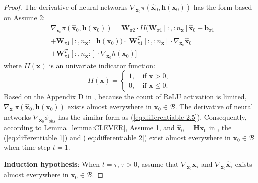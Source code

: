 \documentclass[conference]{IEEEtran}
\newtheorem{proof}{\bf Proof}
\newcommand{\myvec}[1]{\boldsymbol{#1}}
\newcommand{\mymatrix}[1]{\boldsymbol{#1}}
\newcommand{\relu}{ReLU\xspace}
\newcommand{\calB}{\mathcal{B}}
\begin{document}
\begin{proof}
    The derivative of neural networks $\nabla_{\myvec{x}_{0}}\pi(\hat{\myvec{x}}_{0}, 
    \myvec{h}(\myvec{x}_{0}))$ has the form based on Assume 2: 
    \begin{equation}\label{eq:differentiable 2.5}
      \begin{aligned}
      &\nabla_{\myvec{x}_{0}}\pi(\hat{\myvec{x}}_{0},\myvec{h}(\myvec{x}_{0})) = 
      \mymatrix{W}_{\pi 2} \cdot II( \mymatrix{W}_{\pi 1}[:,:n_{\myvec{x}}]\hat{\myvec{x}}_{0} + \myvec{b}_{\pi 1} \\
      & + \mymatrix{W}_{\pi 1}[:,n_{\myvec{x}}:]\myvec{h}(\myvec{x}_{0}) )
      \cdot [ \mymatrix{W}^{T}_{\pi 1}[:,:n_{\myvec{x}}] \cdot \nabla_{\myvec{x}_{0}}\hat{\myvec{x}}_{0} \\
      &+ \mymatrix{W}^{T}_{\pi 1}[:,n_{\myvec{x}}:] \cdot \nabla_{\myvec{x}_{0}}h(\myvec{x}_{0}) ]
    \end{aligned}
    \end{equation}
    where $II(\myvec{x})$ is an univariate indicator function: 
    \begin{equation}\label{eq:indicator function}
      II(\myvec{x}) = \left\{
        \begin{split}
            1, & \ \text{if } \myvec{x} > 0, \\
            0, & \ \text{if } \myvec{x} \leq 0.
        \end{split}
        \right. 
    \end{equation}
    Based on the Appendix D in \cite{weng2018evaluating}, because the count of 
    \relu activation is limited, 
    $\nabla_{\myvec{x}_{0}}\pi(\hat{\myvec{x}}_{0},\myvec{h}(\myvec{x}_{0}))$ 
    exists almost everywhere in $\myvec{x}_{0} \in \calB$. 
    The derivative of neural networks $\nabla_{\myvec{x}_{0}}\phi_{obs}$ 
    has the similar form as (\ref{eq:differentiable 2.5}).
    Consequently, according to Lemma~\ref{lemma:CLEVER}, Assume 1, and $\hat{\myvec{x}}_{0} = \mymatrix{H}\myvec{x}_{0}$ 
    in \cite{lyapunov1992general}, the (\ref{eq:differentiable 1}) and (\ref{eq:differentiable 2}) exist almost everywhere 
    in $\myvec{x}_{0} \in \calB$ when time step $t = 1$. 
  
    \textbf{Induction hypothesis}: When $t = \tau$, $\tau > 0$, 
    assume that $\nabla_{\myvec{x}_{0}}\myvec{x}_{\tau}$ and 
    $\nabla_{\myvec{x}_{0}}\hat{\myvec{x}}_{\tau}$ exists almost everywhere  in $\myvec{x}_{0} \in \calB$.
  

\end{proof}
\end{document}
